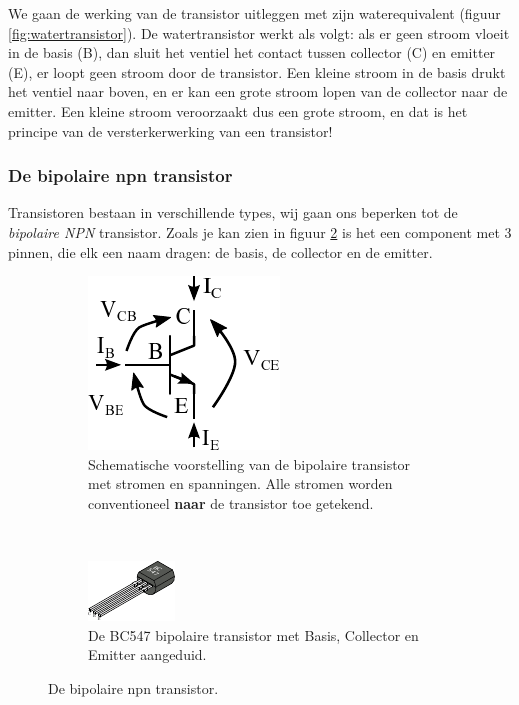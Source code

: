 \documentclass{article}
\begin{document}
			We gaan de werking van de transistor uitleggen met zijn waterequivalent (figuur \ref{fig:watertransistor}). De watertransistor werkt als volgt: als er geen stroom vloeit in de basis (B), dan sluit het ventiel het contact tussen collector (C) en emitter (E), er loopt geen stroom door de transistor. Een kleine stroom in de basis drukt het ventiel naar boven, en er kan een grote stroom lopen van de collector naar de emitter. Een kleine stroom veroorzaakt dus een grote stroom, en dat is het principe van de versterkerwerking van een transistor! 

			
			\subsubsection{De bipolaire npn transistor}
				 Transistoren bestaan in verschillende types, wij gaan ons beperken tot de \emph{bipolaire NPN} transistor. Zoals je kan zien in figuur \ref{subfig:transistor_bce} is het een component met 3 pinnen, die elk een naam dragen: de basis, de collector en de emitter.
				\begin{figure}[htbp]
				\centering
					\begin{subfigure}[b]{0.45\linewidth}
						\centering
					\includegraphics{transistor_VI}
					\caption{Schematische voorstelling van de bipolaire transistor met stromen en spanningen. Alle stromen worden conventioneel \textbf{naar} de transistor toe getekend.}
					\label{subfig:transistor_vi}
					\end{subfigure}
					~
					\begin{subfigure}[b]{0.45\linewidth}
						\centering
						\includegraphics[scale=2]{transistor}
						\caption{De BC547 bipolaire transistor met Basis, Collector en Emitter aangeduid.}
						\label{subfig:transistor_bce}
					\end{subfigure}
					
					\caption{De bipolaire npn transistor.}
					\label{fig:transistor}
				\end{figure}
\end{document}
